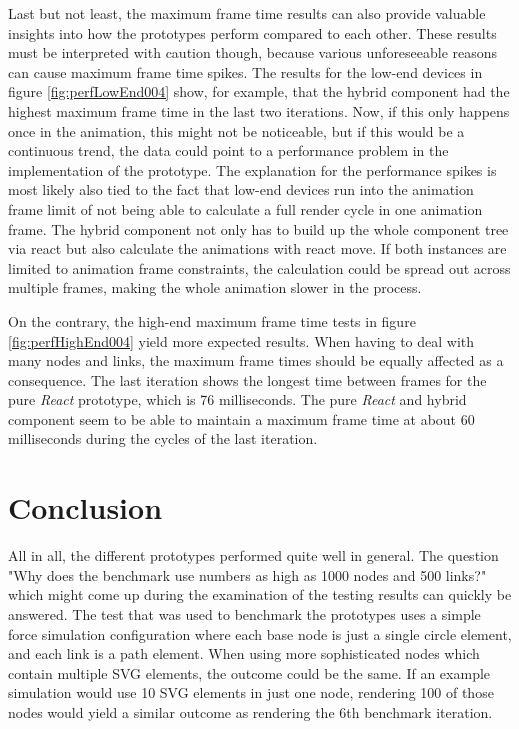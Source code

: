 Last but not least, the maximum frame time results can also provide valuable insights into how the prototypes perform compared to each other. These results must be interpreted with caution though, because various unforeseeable reasons can cause maximum frame time spikes. The results for the low-end devices in figure \ref{fig:perfLowEnd004} show, for example, that the hybrid component had the highest maximum frame time in the last two iterations. Now, if this only happens once in the animation, this might not be noticeable, but if this would be a continuous trend, the data could point to a performance problem in the implementation of the prototype. The explanation for the performance spikes is most likely also tied to the fact that low-end devices run into the animation frame limit of not being able to calculate a full render cycle in one animation frame. The hybrid component not only has to build up the whole component tree via react but also calculate the animations with react move. If both instances are limited to animation frame constraints, the calculation could be spread out across multiple frames, making the whole animation slower in the process.

On the contrary, the high-end maximum frame time tests in figure \ref{fig:perfHighEnd004} yield more expected results. When having to deal with many nodes and links, the maximum frame times should be equally affected as a consequence. The last iteration shows the longest time between frames for the pure \emph{React} prototype, which is 76 milliseconds. The pure \emph{React} and hybrid component seem to be able to maintain a maximum frame time at about 60 milliseconds during the cycles of the last iteration.


\section{Conclusion}

All in all, the different prototypes performed quite well in general. The question "Why does the benchmark use numbers as high as 1000 nodes and 500 links?" which might come up during the examination of the testing results can quickly be answered. The test that was used to benchmark the prototypes uses a simple force simulation configuration where each base node is just a single circle element, and each link is a path element. When using more sophisticated nodes which contain multiple SVG elements, the outcome could be the same. If an example simulation would use 10 SVG elements in just one node, rendering 100 of those nodes would yield a similar outcome as rendering the 6th benchmark iteration.

